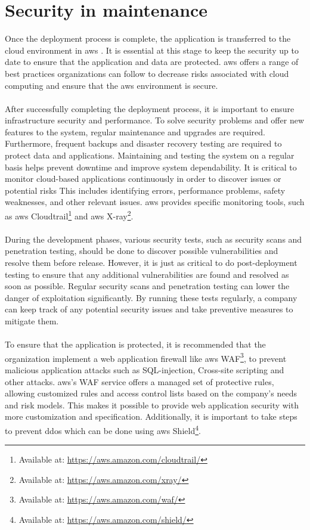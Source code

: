  
\section{Security in maintenance}
Once the deployment process is complete, the application is transferred to the cloud environment in \acrlong{aws} \cite{awsafterdep}. It is essential at this stage to keep the security up to date to ensure that the application and data are protected. \acrshort{aws} offers a range of best practices organizations can follow to decrease risks associated with cloud computing and ensure that the  \acrshort{aws} environment is secure.
\\~\\
After successfully completing the deployment process, it is important to ensure infrastructure security and performance. To solve security problems and offer new features to the system, regular maintenance and upgrades are required. Furthermore, frequent backups and disaster recovery testing are required to protect data and applications. Maintaining and testing the system on a regular basis helps prevent downtime and improve system dependability.
\newpage
It is critical to monitor cloud-based applications continuously in order to discover issues or potential risks  This includes identifying errors, performance problems, safety weaknesses, and other relevant issues. \acrshort{aws} provides specific monitoring tools, such as \acrshort{aws} Cloudtrail\footnote{Available at: \url{https://aws.amazon.com/cloudtrail/}} and \acrshort{aws} X-ray\footnote{Available at: \url{https://aws.amazon.com/xray/}}. 
\\~\\
During the development phases, various security tests, such as security scans and penetration testing, should be done to discover possible vulnerabilities and resolve them before release. However, it is just as critical to do post-deployment testing to ensure that any additional vulnerabilities are found and resolved as soon as possible. Regular security scans and penetration testing can lower the danger of exploitation significantly. By running these tests regularly, a company can keep track of any potential security issues and take preventive measures to mitigate them. 
\\~\\
To ensure that the application is protected, it is recommended that the organization implement a web application firewall like \acrshort{aws} WAF\footnote{Available at: \url{https://aws.amazon.com/waf/}}, to prevent malicious application attacks such as \gls{SQL-injection}, \gls{Cross-site scripting} and other attacks. \acrshort{aws}'s WAF service offers a managed set of protective rules, allowing customized rules and access control lists based on the company's needs and risk models. This makes it possible to provide web application security with more customization and specification. Additionally, it is important to take steps to prevent \gls{ddos} which can be done using \acrshort{aws} Shield\footnote{Available at: \url{https://aws.amazon.com/shield/}}.
